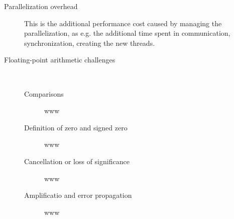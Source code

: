 \documentclass{article}
\begin{document}
\begin{description}
	\item[Parallelization overhead] This is the additional performance cost caused by managing the parallelization, as e.g. the additional time spent in communication, synchronization, creating the new threads.
	
	\item[Floating-point arithmetic challenges] ~
				\begin{description}
			\item[Comparisons] www
			\item[Definition of zero and signed zero] www
			\item[Cancellation or loss of significance] www
			\item[Amplificatio and error propagation] www
		\end{description}
\end{description}
\end{document}

